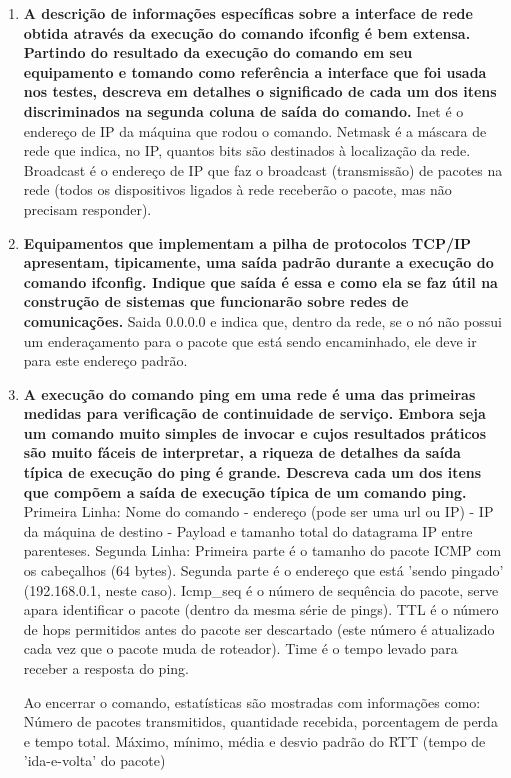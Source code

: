 \begin{enumerate}
  \item \textbf{A descrição de informações específicas sobre a interface de rede obtida através da execução
    do comando ifconfig é bem extensa. Partindo do resultado da execução do comando em seu
    equipamento e tomando como referência a interface que foi usada nos testes, descreva em
    detalhes o significado de cada um dos itens discriminados na segunda coluna de saída do
    comando.}
    Inet é o endereço de IP da máquina que rodou o comando. Netmask é a máscara de rede que indica, no IP, quantos bits são destinados à localização da rede. Broadcast é o endereço de IP que faz o broadcast (transmissão) de pacotes na rede (todos os dispositivos ligados à rede receberão o pacote, mas não precisam responder).

  \item \textbf{Equipamentos que implementam a pilha de protocolos TCP/IP apresentam, tipicamente, uma
    saída padrão durante a execução do comando ifconfig. Indique que saída é essa e como ela
    se faz útil na construção de sistemas que funcionarão sobre redes de comunicações.}
    Saida 0.0.0.0 e indica que, dentro da rede, se o nó não possui um enderaçamento para o pacote que está sendo encaminhado, ele deve ir para este endereço padrão.

  \item \textbf{A execução do comando ping em uma rede é uma das primeiras medidas para verificação de
    continuidade de serviço. Embora seja um comando muito simples de invocar e cujos
    resultados práticos são muito fáceis de interpretar, a riqueza de detalhes da saída típica de
    execução do ping é grande. Descreva cada um dos itens que compõem a saída de execução
    típica de um comando ping.}
    Primeira Linha:
        Nome do comando - endereço (pode ser uma url ou IP) - IP da máquina de destino - Payload e tamanho total do datagrama IP entre parenteses.
    Segunda Linha:
        Primeira parte é o tamanho do pacote ICMP com os cabeçalhos (64 bytes). Segunda parte é o endereço que está 'sendo pingado' (192.168.0.1, neste caso). Icmp\_seq é o número de sequência do pacote, serve apara identificar o pacote (dentro da mesma série de pings). TTL é o número de hops permitidos antes do pacote ser descartado (este número é atualizado cada vez que o pacote muda de roteador). Time é o tempo levado para receber a resposta do ping.
     
     Ao encerrar o comando, estatísticas são mostradas com informações como: Número de pacotes transmitidos, quantidade recebida, porcentagem de perda e tempo total. Máximo, mínimo, média e desvio padrão do RTT (tempo de 'ida-e-volta' do pacote)


\end{enumerate}
